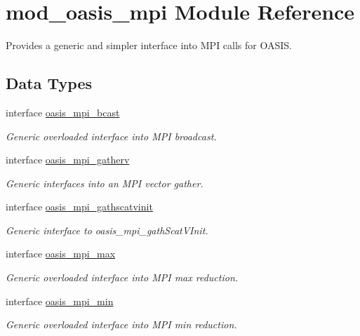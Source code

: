\hypertarget{namespacemod__oasis__mpi}{}\section{mod\+\_\+oasis\+\_\+mpi Module Reference}
\label{namespacemod__oasis__mpi}


Provides a generic and simpler interface into M\+PI calls for O\+A\+S\+IS.  


\subsection*{Data Types}
\begin{DoxyCompactItemize}
\item 
interface \hyperlink{interfacemod__oasis__mpi_1_1oasis__mpi__bcast}{oasis\+\_\+mpi\+\_\+bcast}
\begin{DoxyCompactList}\small\item\em Generic overloaded interface into M\+PI broadcast. \end{DoxyCompactList}\item 
interface \hyperlink{interfacemod__oasis__mpi_1_1oasis__mpi__gatherv}{oasis\+\_\+mpi\+\_\+gatherv}
\begin{DoxyCompactList}\small\item\em Generic interfaces into an M\+PI vector gather. \end{DoxyCompactList}\item 
interface \hyperlink{interfacemod__oasis__mpi_1_1oasis__mpi__gathscatvinit}{oasis\+\_\+mpi\+\_\+gathscatvinit}
\begin{DoxyCompactList}\small\item\em Generic interface to oasis\+\_\+mpi\+\_\+gath\+Scat\+V\+Init. \end{DoxyCompactList}\item 
interface \hyperlink{interfacemod__oasis__mpi_1_1oasis__mpi__max}{oasis\+\_\+mpi\+\_\+max}
\begin{DoxyCompactList}\small\item\em Generic overloaded interface into M\+PI max reduction. \end{DoxyCompactList}\item 
interface \hyperlink{interfacemod__oasis__mpi_1_1oasis__mpi__min}{oasis\+\_\+mpi\+\_\+min}
\begin{DoxyCompactList}\small\item\em Generic overloaded interface into M\+PI min reduction. \end{DoxyCompactList}\item 

\end{DoxyCompactItemize}

